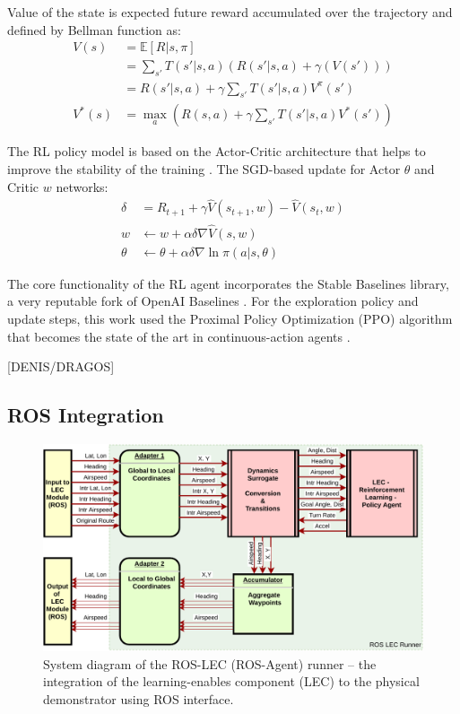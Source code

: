 Value of the state is expected future reward accumulated over the trajectory and defined by Bellman function as:
\begin{align}
	V(s) &=  \mathbb{E} [R | s, \pi] \\
	&= \sum_{s'} T(s'|s,a) \left( R(s'|s,a) + \gamma ( V(s')) \right) \\
	&=  R(s'|s,a) + \gamma \sum_{s'} T(s'|s,a) V^{\pi}(s') \\
	V^{*}(s) &= \max_{a} \left( R(s,a) + \gamma \sum_{s'} T(s'|s,a) V^{*}(s') \right)
\end{align}

The RL policy model is based on the Actor-Critic architecture that helps to improve the stability of the training \cite{sutton2018reinforcement}. The SGD-based update for Actor $\theta$ and Critic $w$ networks:
\begin{align}
	\delta &=  R_{t+1} +\gamma \hat V(s_{t+1},w) - \hat V(s_t,w) \\
	w &\leftarrow w + \alpha \delta \nabla \hat V (s, w) \\
	\theta &\leftarrow \theta + \alpha \delta \nabla \ln \pi (a|s, \theta)
\end{align} 

The core functionality of the RL agent incorporates the Stable Baselines library, a very reputable fork of OpenAI Baselines \cite{hill2018stable}. For the exploration policy and update steps, this work used the Proximal Policy Optimization (PPO) algorithm that becomes the state of the art in continuous-action agents \cite{schulman2017proximal}.



[DENIS/DRAGOS]

\subsection{ROS Integration}

\begin{figure}[h]
	\centering
	\includegraphics[width=\linewidth]{figures/cp25_ros.pdf}
	\caption{System diagram of the ROS-LEC (ROS-Agent) runner -- the integration of the learning-enables component (LEC) to the physical demonstrator using ROS interface.}
	\label{fig:integration}
\end{figure}

